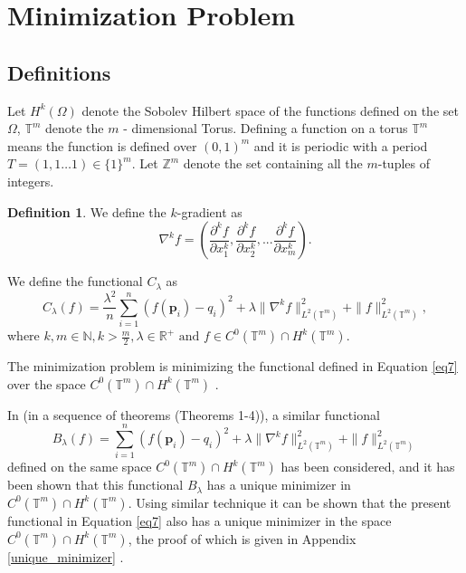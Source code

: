 \documentclass[multixcb]{amstext-l}
\theoremstyle{plain}
\theoremstyle{definition}
\theoremstyle{definition}
\newtheorem{definition}[theorem]{Definition}
\theoremstyle{remark}
\numberwithin{equation}{chapter}
\begin{document}
\section{Minimization Problem}
\label{mnmz}
\subsection{Definitions}

Let $H^k(\Omega)$ denote the Sobolev Hilbert space of the functions defined on the set $\Omega$, $\mathbb{T}^m$ denote the $m $ - dimensional Torus. Defining a function on a torus $\mathbb{T}^m$ means the function is defined over $(0,1)^m$ and it is periodic with a period $T = (1,1\ldots 1) \in \{1\}^m$. Let $\mathbb{Z}^m$ denote the set containing all the $m$-tuples of integers.
 \begin{definition}
\label{kgradient}
We define the $k$-gradient as 
\begin{equation}
\nabla^kf = (\frac{\partial^{k}f}{\partial x_1^{k}},\frac{\partial^{k}f}{\partial x_2^{k}},...\frac{\partial^{k}f}{\partial x_m^{k}}   ). 
\end{equation}
\end{definition}
We define the functional $C_{\lambda}$ as 
\begin{equation}
\label{eq7}
 C_{\lambda}(f) = \frac{\lambda^2}{n}\sum\limits_{i=1}^{n}(f(\boldsymbol{p}_i)-q_i)^2 + \lambda\|\nabla^kf\|_{L^2(\mathbb{T}^m)}^2 + \|f\|_{L^2(\mathbb{T}^m)}^2, \end{equation}
where $k,m \in \mathbb{N}, k>\frac{m}{2}, 
\lambda \in \mathbb{R}^+ \mbox{ and } f \in C^0(\mathbb{T}^m)\cap H^k(\mathbb{T}^m)$. 

The minimization problem is minimizing the functional defined in Equation \ref{eq7} over the space $ C^0(\mathbb{T}^m)\cap H^k(\mathbb{T}^m)$ .

In \cite{Afunctionfittingmethod}(in a sequence of theorems (Theorems 1-4)), a similar functional \begin{equation}\label{sim_func}
B_{\lambda}(f) =  \sum\limits_{i=1}^{n}(f(\boldsymbol{p}_i)-q_i)^2 + \lambda\|\nabla^kf\|_{L^2(\mathbb{T}^m)}^2 + \|f\|_{L^2(\mathbb{T}^m)}^2
\end{equation}defined on the same space $C^0(\mathbb{T}^m)\cap H^k(\mathbb{T}^m)$ has been considered, and it has been shown that this functional $B_{\lambda}$ has a unique minimizer in $C^0(\mathbb{T}^m)\cap H^k(\mathbb{T}^m)$. Using similar technique it can be shown that the present functional in Equation \ref{eq7} also has a unique minimizer in the space $C^0(\mathbb{T}^m)\cap H^k(\mathbb{T}^m) $, the proof of which is given in Appendix \ref{unique_minimizer} .
\end{document}
